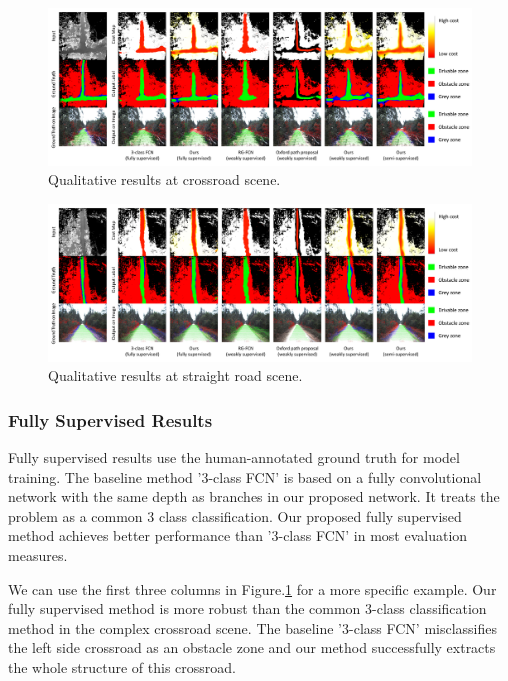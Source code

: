 \documentclass[letterpaper, 10 pt, conference]{ieeeconf}  %
\begin{document}
\begin{figure}[ht]
	\centering
	\includegraphics[scale=0.15]{crossRoad.pdf}
	\caption{Qualitative results at crossroad scene.}
	\label{fig:cross_road}
	\vspace{-3mm}
\end{figure}
\begin{figure}[ht]
	\centering
	\includegraphics[scale=0.15]{straightRoad.pdf}
	\caption{Qualitative results at straight road scene.}
	\label{fig:straight_road}
	\vspace{-3mm}
\end{figure}

\subsubsection{Fully Supervised Results}
Fully supervised results use the human-annotated ground truth for model training. The baseline method '3-class FCN' is based on a fully convolutional network\cite{long2015fully} with the same depth as branches in our proposed network. It treats the problem as a common 3 class classification. Our proposed fully supervised method achieves better performance than '3-class FCN' in most evaluation measures.

We can use the first three columns in Figure.\ref{fig:cross_road} for a more specific example. Our fully supervised method is more robust than the common 3-class classification method in the complex crossroad scene. The baseline '3-class FCN' misclassifies the left side crossroad as an obstacle zone and our method successfully extracts the whole structure of this crossroad.
\end{document}
